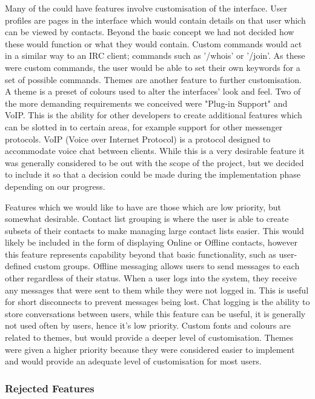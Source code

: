Many of the could have features involve customisation of the interface. User profiles are pages in the interface which would contain details on that user which can be viewed by contacts. Beyond the basic concept we had not decided how these would function or what they would contain. Custom commands would act in a similar way to an IRC client; commands such as '/whois' or '/join'. As these were custom commands, the user would be able to set their own keywords for a set of possible commands. Themes are another feature to further customisation. A theme is a preset of colours used to alter the interfaces' look and feel. Two of the more demanding requirements we conceived were "Plug-in Support" and VoIP. This is the ability for other developers to create additional features which can be slotted in to certain areas, for example support for other messenger protocols. VoIP (Voice over Internet Protocol) is a protocol designed to accommodate voice chat between clients. While this is a very desirable feature it was generally considered to be out with the scope of the project, but we decided to include it so that a decision could be made during the implementation phase depending on our progress.

Features which we would like to have are those which are low priority, but somewhat desirable. Contact list grouping is where the user is able to create subsets of their contacts to make managing large contact lists easier. This would likely be included in the form of displaying Online or Offline contacts, however this feature represents capability beyond that basic functionality, such as user-defined custom groups. Offline messaging allows users to send messages to each other regardless of their status. When a user logs into the system, they receive any messages that were sent to them while they were not logged in. This is useful for short disconnects to prevent messages being lost. Chat logging is the ability to store conversations between users, while this feature can be useful, it is generally not used often by users, hence it's low priority. Custom fonts and colours are related to themes, but would provide a deeper level of customisation. Themes were given a higher priority because they were considered easier to implement and would provide an adequate level of customisation for most users.


\subsubsection{Rejected Features}

